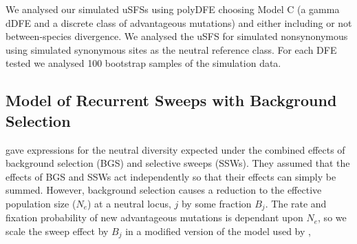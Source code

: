 	 We analysed our simulated uSFSs using polyDFE choosing Model C (a gamma dDFE and a discrete class of advantageous mutations) and either including or not  between-species divergence. We analysed the uSFS for simulated nonsynonymous using simulated synonymous sites as the neutral reference class. For each DFE tested we analysed 100 bootstrap samples of the simulation data.
 
 	
	\subsection*{Model of Recurrent Sweeps with Background Selection}

	
	\cite{RN323} gave expressions for the neutral diversity expected under the combined effects of background selection (BGS) and selective sweeps (SSWs). They assumed that the effects of BGS and SSWs act independently so that their effects can simply be summed. However, background selection causes a reduction to the effective population size ($N_e$) at a neutral locus, $j$ by some fraction $B_j$. The rate and fixation probability of new advantageous mutations is dependant upon $N_e$, so we scale the sweep effect by $B_j$ in a modified version of the model used by \cite{RN323},
	
